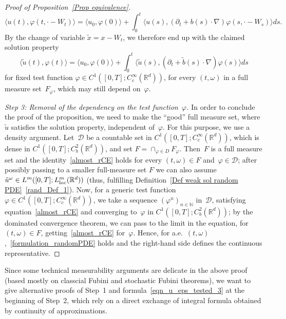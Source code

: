 \documentclass[a4paper,10pt]{article}
\newcommand\1{\mathbbm{1}}
\newcommand{\lan}{\langle}
\newcommand{\ran}{\rangle}
\newcommand{\td}{\tilde}
\newcommand\loc{{\rm loc}}
\numberwithin{equation}{section}
\begin{document}
\begin{proof}[Proof of Proposition~\ref{Prop equivalence}]
\begin{equation*}
\lan u(t),\varphi(t,\cdot-W_t)\ran = \lan u_0,\varphi(0)\ran +\int^t_0\lan u(s),(\partial_t+b(s)\cdot\nabla)\varphi(s,\cdot-W_s)\ran ds.
\end{equation*}
By the change of variable $\tilde{x}=x-W_t$, we therefore end up with the claimed solution property
\begin{equation}
\lan\td{u}(t),\varphi(t)\ran = \lan u_0,\varphi(0)\ran +\int^t_0\lan\td{u}(s),(\partial_t+\td{b}(s)\cdot\nabla)\varphi(s)\ran ds\label{almost_rCE}
\end{equation}
for fixed test function $\varphi \in C^1([0,T];C^\infty_c(\mathbb{R}^d))$, for every $(t,\omega)$ in a full measure set~$F_\varphi$, which may still depend on~$\varphi$.

{\emph{Step 3: Removal of the dependency on the test function~$\varphi$.}} In order to conclude the proof of the proposition, we need to make the ``good'' full measure set, where $\td{u}$ satisfies the solution property, independent of~$\varphi$. For this purpose, we use a density argument. Let~$\mathcal{D}$ be a countable set in $C^1([0,T];C^\infty_c(\mathbb{R}^d))$, which is dense in $C^1([0,T]; C^2_b(\mathbb{R}^d))$, and set $F=\cap_{\varphi\in D}F_\varphi$. Then~$F$ is a full measure set and the identity~\eqref{almost_rCE} holds for every $(t,\omega) \in F$ and~$\varphi \in \mathcal{D}$; after possibly passing to a smaller full-measure set $F$ we can also assume $\td{u}^\omega \in L^m([0,T];L^m_\loc(\mathbb{R}^d))$ (thus, fulfilling Definition~\ref{Def weak sol random PDE}~\ref{rand_Def_1}). Now, for a generic test function~$\varphi \in C^1([0,T];C^\infty_c(\mathbb{R}^d))$, we take a sequence $(\varphi^n)_{n \in \mathbb{N}}$ in~$\mathcal{D}$, satisfying equation~\eqref{almost_rCE} and converging to~$\varphi$ in $C^1([0,T]; C^2_b(\mathbb{R}^d))$; by the dominated convergence theorem, we can pass to the limit in the equation, for $(t,\omega) \in F$, getting~\eqref{almost_rCE} for~$\varphi$. Hence, for a.e.~$(t,\omega)$,~\eqref{formulation_randomPDE} holds and the right-hand side defines the continuous representative.
\end{proof}

Since some technical measurability arguments are delicate in the above proof (based mostly on classcial Fubini and stochastic Fubini theorems), we want to give alternative proofs of Step~1 and formula~\eqref{eqn_u_eps_tested_3} at the beginning of Step~2, which rely on a direct exchange of integral formula obtained by continuity of approximations.
\end{document}
